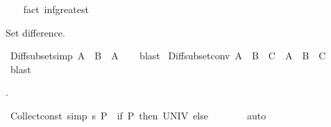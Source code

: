 \begin{isabellebody}
%
\isadelimproof
\ \ %
\endisadelimproof
%
\isatagproof
{}\isamarkupfalse%
\ {\isacharparenleft}{\kern0pt}fact\ inf{\isacharunderscore}{\kern0pt}greatest{\isacharparenright}{\kern0pt}%
\endisatagproof
{\isafoldproof}%
%
\isadelimproof
%
\endisadelimproof
%
\begin{isamarkuptext}%
\medskip Set difference.%
\end{isamarkuptext}\isamarkuptrue%
\isamarkupfalse%
\ Diff{\isacharunderscore}{\kern0pt}subset{\isacharbrackleft}{\kern0pt}simp{\isacharbrackright}{\kern0pt}{\isacharcolon}{\kern0pt}\ {\isachardoublequoteopen}A\ {\isacharminus}{\kern0pt}\ B\ {\isasymsubseteq}\ A{\isachardoublequoteclose}\isanewline
%
\isadelimproof
\ \ %
\endisadelimproof
%
\isatagproof
{}\isamarkupfalse%
\ blast%
\endisatagproof
{\isafoldproof}%
%
\isadelimproof
\isanewline
%
\endisadelimproof
\isanewline
{}\isamarkupfalse%
\ Diff{\isacharunderscore}{\kern0pt}subset{\isacharunderscore}{\kern0pt}conv{\isacharcolon}{\kern0pt}\ {\isachardoublequoteopen}A\ {\isacharminus}{\kern0pt}\ B\ {\isasymsubseteq}\ C\ {\isasymlongleftrightarrow}\ A\ {\isasymsubseteq}\ B\ {\isasymunion}\ C{\isachardoublequoteclose}\isanewline
%
\isadelimproof
\ \ %
\endisadelimproof
%
\isatagproof
{}\isamarkupfalse%
\ blast%
\endisatagproof
{\isafoldproof}%
%
\isadelimproof
%
\endisadelimproof
%
\isadelimdocument
%
\endisadelimdocument
%
\isatagdocument
%
\isamarkuptrue%
%
\endisatagdocument
{\isafolddocument}%
%
\isadelimdocument
%
\endisadelimdocument
%
\begin{isamarkuptext}%
\isa{{\isacharbraceleft}{\kern0pt}{\isacharbraceright}{\kern0pt}}.%
\end{isamarkuptext}\isamarkuptrue%
\isamarkupfalse%
\ Collect{\isacharunderscore}{\kern0pt}const\ {\isacharbrackleft}{\kern0pt}simp{\isacharbrackright}{\kern0pt}{\isacharcolon}{\kern0pt}\ {\isachardoublequoteopen}{\isacharbraceleft}{\kern0pt}s{\isachardot}{\kern0pt}\ P{\isacharbraceright}{\kern0pt}\ {\isacharequal}{\kern0pt}\ {\isacharparenleft}{\kern0pt}if\ P\ then\ UNIV\ else\ {\isacharbraceleft}{\kern0pt}{\isacharbraceright}{\kern0pt}{\isacharparenright}{\kern0pt}{\isachardoublequoteclose}\isanewline
\ \ %
\isanewline
%
\isadelimproof
\ \ %
\endisadelimproof
%
\isatagproof
{}\isamarkupfalse%
\ auto%
\endisatagproof
{\isafoldproof}%

\end{isabellebody}
